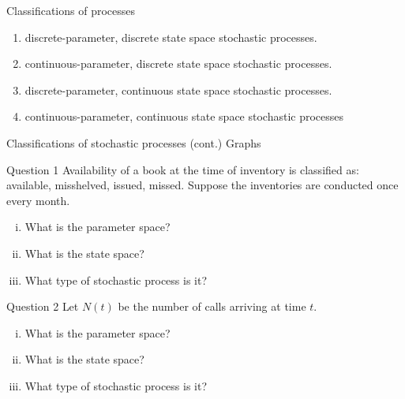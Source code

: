 \documentclass[12pt,ignorenonframetext,]{beamer}
\begin{document}
\begin{frame}{Classifications of processes}
\protect\hypertarget{classifications-of-processes}{}
\begin{enumerate}
\item
  discrete-parameter, discrete state space stochastic processes.
\item
  continuous-parameter, discrete state space stochastic processes.
\item
  discrete-parameter, continuous state space stochastic processes.
\item
  continuous-parameter, continuous state space stochastic processes
\end{enumerate}
\end{frame}

\begin{frame}{Classifications of stochastic processes (cont.)}
\protect\hypertarget{classifications-of-stochastic-processes-cont.}{}
Graphs
\end{frame}

\begin{frame}{Question 1}
\protect\hypertarget{question-1}{}
Availability of a book at the time of inventory is classified as:
available, misshelved, issued, missed. Suppose the inventories are
conducted once every month.

\begin{enumerate}
[i)]
\item
  What is the parameter space?
\item
  What is the state space?
\item
  What type of stochastic process is it?
\end{enumerate}
\end{frame}

\begin{frame}{Question 2}
\protect\hypertarget{question-2}{}
Let \(N(t)\) be the number of calls arriving at time \(t\).

\begin{enumerate}
[i)]
\item
  What is the parameter space?
\item
  What is the state space?
\item
  What type of stochastic process is it?
\end{enumerate}
\end{frame}
\end{document}
